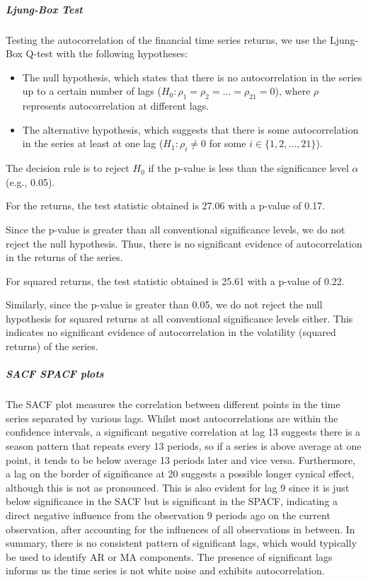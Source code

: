 \documentclass{article}
\begin{document}
\subparagraph{Ljung-Box Test}

Testing the autocorrelation of the financial time series returns, we use the Ljung-Box Q-test with the following hypotheses:

\begin{itemize}
	\item The null hypothesis, which states that there is no autocorrelation in the series up to a certain number of lags ($H_0: \rho_1 = \rho_2 = \ldots = \rho_{21} = 0$), where $\rho$ represents autocorrelation at different lags.
	\item The alternative hypothesis, which suggests that there is some autocorrelation in the series at least at one lag ($H_1: \rho_i \neq 0$ for some $i \in \{1, 2, \ldots, 21 \}$).
\end{itemize}

The decision rule is to reject $H_0$ if the p-value is less than the significance level $\alpha$ (e.g., 0.05).

For the returns, the test statistic obtained is 27.06 with a p-value of 0.17.

Since the p-value is greater than all conventional significance levels, we do not reject the null hypothesis. 
Thus, there is no significant evidence of autocorrelation in the returns of the series.

For squared returns, the test statistic obtained is 25.61 with a p-value of 0.22.

Similarly, since the p-value is greater than 0.05, we do not reject the null hypothesis for squared returns  at all conventional significance levels either.
This indicates no significant evidence of autocorrelation in the volatility (squared returns) of the series.

\subparagraph{SACF SPACF plots}

The SACF plot measures the correlation between different points in the time series separated by various lags. 
Whilst most autocorrelations are within the confidence intervals, a significant negative correlation at lag 13 suggests there is a season pattern that repeats every 13 periods, so if a series is above average at one point, it tends to be below average 13 periods later and vice versa. 
Furthermore, a lag on the border of significance at 20 suggests a possible longer cynical effect, although this is not as pronounced.
This is also evident for lag 9 since it is just below significance in the SACF but is significant in the SPACF, indicating a direct negative influence from the observation 9 periods ago on the current observation, after accounting for the influences of all observations in between. 
In summary, there is no consistent pattern of significant lags, which would typically be used to identify AR or MA components. 
The presence of significant lags informs us the time series is not white noise and exhibits autocorrelation. 
\end{document}
